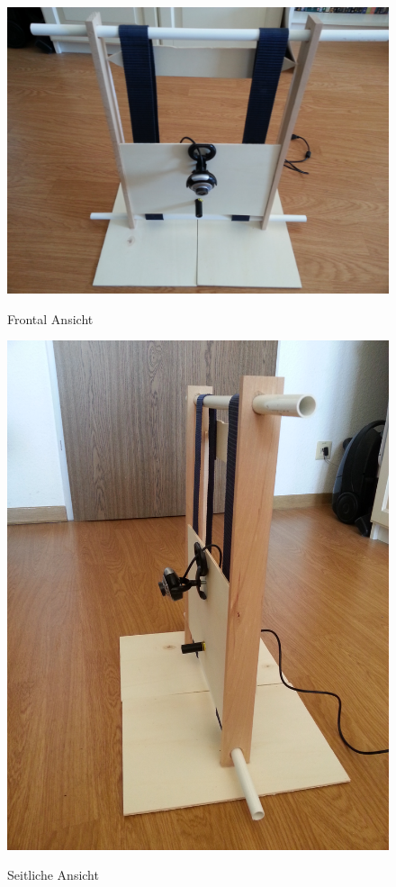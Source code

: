 \begin{figure}
\centering
\begin{minipage}{0.45\textwidth}
\centering \includegraphics[width=\textwidth]{images/Scanner1.jpg}
\label{fig:scanner1}
\caption{Frontal Ansicht}
\end{minipage}
\begin{minipage}{0.45\textwidth}
\centering\includegraphics[width=\textwidth, angle = -90]{images/Scanner2.jpg}
\label{fig:scanner2}
\caption{Seitliche Ansicht}
\end{minipage}
\end{figure}

